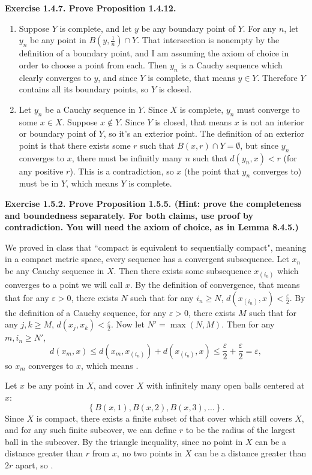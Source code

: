 \documentclass{article}
\begin{document}
\textbf{Exercise 1.4.7. Prove Proposition 1.4.12.}
\begin{enumerate}[label=(\alph*)]
    \item Suppose $Y$ is complete, and let $y$ be any boundary point of $Y$. For any $n$, let $y_n$ be any point in $B(y, \frac{1}{n}) \cap Y$. That intersection is nonempty by the definition of a boundary point, and I am assuming the axiom of choice in order to choose a point from each. Then $y_n$ is a Cauchy sequence which clearly converges to $y$, and since $Y$ is complete, that means $y \in Y$. Therefore $Y$ contains all its boundary points, so $Y$ is closed.
    \item Let $y_n$ be a Cauchy sequence in $Y$. Since $X$ is complete, $y_n$ must converge to some $x \in X$. Suppose $x \not\in Y$. Since $Y$ is closed, that means $x$ is not an interior or boundary point of $Y$, so it's an exterior point. The definition of an exterior point is that there exists some $r$ such that $B(x, r) \cap Y = \emptyset$, but since $y_n$ converges to $x$, there must be infinitly many $n$ such that $d(y_n, x) < r$ (for any positive $r$). This is a contradiction, so $x$ (the point that $y_n$ converges to) must be in $Y$, which means $Y$ is complete.
\end{enumerate}

\textbf{Exercise 1.5.2. Prove Proposition 1.5.5. (Hint: prove the completeness and boundedness separately. For both claims, use proof by contradiction. You will need the axiom of choice, as in Lemma 8.4.5.)}
\par
We proved in class that ``compact is equivalent to sequentially compact", meaning in a compact metric space, every sequence has a convergent subsequence. Let $x_n$ be any Cauchy sequence in $X$. Then there exists some subsequence $x_{(i_n)}$ which converges to a point we will call $x$. By the definition of convergence, that means that for any $\varepsilon > 0$, there exists $N$ such that for any $i_n \geq N$, $d(x_{(i_n)}, x) < \frac{\varepsilon}{2}$. By the definition of a Cauchy sequence, for any $\varepsilon > 0$, there exists $M$ such that for any $j, k \geq M$, $d(x_j, x_k) < \frac{\varepsilon}{2}$. Now let $N' = \max(N,M)$. Then for any $m, i_n \geq N'$,
\[ d(x_m, x) \leq d(x_m, x_{(i_n)}) + d(x_{(i_n)}, x) \leq \frac{\varepsilon}{2} + \frac{\varepsilon}{2} = \varepsilon, \]
so $x_m$ converges to $x$, which means .
\par
Let $x$ be any point in $X$, and cover $X$ with infinitely many open balls centered at $x$:
\[ \left\{ B(x, 1), B(x, 2), B(x, 3), \dots \right\}. \]
Since $X$ is compact, there exists a finite subset of that cover which still covers $X$, and for any such finite subcover, we can define $r$ to be the radius of the largest ball in the subcover. By the triangle inequality, since no point in $X$ can be a distance greater than $r$ from $x$, no two points in $X$ can be a distance greater than $2r$ apart, so .
\end{document}
